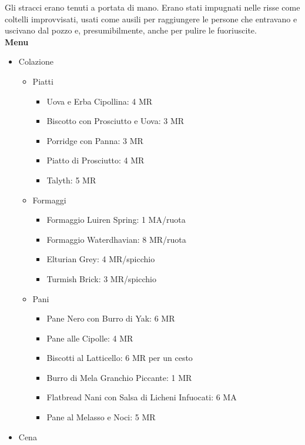 \documentclass{article}
\begin{document}
Gli stracci erano tenuti a portata di mano. Erano stati impugnati nelle risse come coltelli improvvisati, usati come ausili per raggiungere le persone che entravano e uscivano dal pozzo e, presumibilmente, anche per pulire le fuoriuscite. \\
\textbf{Menu} \\ 
\begin{itemize}
  

\item Colazione
\begin{itemize}
  \item Piatti
    \begin{itemize}
        \item Uova e Erba Cipollina: 4 MR
        \item Biscotto con Prosciutto e Uova: 3 MR
        \item Porridge con Panna: 3 MR
        \item Piatto di Prosciutto: 4 MR
        \item Talyth: 5 MR
    \end{itemize}


  \item{Formaggi}
    \begin{itemize}
        \item Formaggio Luiren Spring: 1 MA/ruota
        \item Formaggio Waterdhavian: 8 MR/ruota
        \item Elturian Grey: 4 MR/spicchio
        \item Turmish Brick: 3 MR/spicchio
    \end{itemize}

  \item{Pani}
      \begin{itemize}
        \item Pane Nero con Burro di Yak: 6 MR
        \item Pane alle Cipolle: 4 MR
        \item Biscotti al Latticello: 6 MR per un cesto
        \item Burro di Mela Granchio Piccante: 1 MR
        \item Flatbread Nani con Salsa di Licheni Infuocati: 6 MA
        \item Pane al Melasso e Noci: 5 MR
    \end{itemize}
  \end{itemize}
\item Cena
\begin{itemize}


\end{itemize}
\end{itemize}
\end{document}
